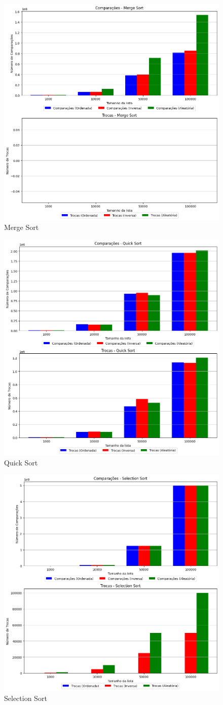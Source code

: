 \documentclass[tcc1,project]{uftex}
\begin{document}
\begin{figure}[!h]
    \centering
    \includegraphics[width=0.5\linewidth]{graficos/grafico_Merge Sort_comparisons_swaps.png}
    \caption{Merge Sort}
    \label{fig:merge-sort}
\end{figure}

\begin{figure}[!h]
    \centering
    \includegraphics[width=0.5\linewidth]{graficos/grafico_Quick Sort_comparisons_swaps.png}
    \caption{Quick Sort}
    \label{fig:quick-sort}
\end{figure}

\begin{figure}[!h]
    \centering
    \includegraphics[width=0.5\linewidth]{graficos/grafico_Selection Sort_comparisons_swaps.png}
    \caption{Selection Sort}
    \label{fig:selection-sort}
\end{figure}
\end{document}
